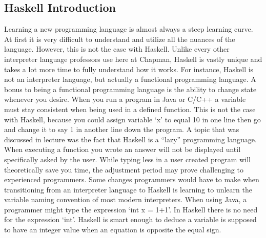 \documentclass{article}
\begin{document}
    \subsection {Haskell Introduction}
    Learning a new programming language is almost always a steep learning curve. At first it is very difficult to understand and utilize all the nuances of the language. However, this is not the case with Haskell. Unlike every other interpreter language professors use here at Chapman, Haskell is vastly unique and takes a lot more time to fully understand how it works. For instance, Haskell is not an interpreter language, but actually a functional programming language. A bonus to being a functional programming language is the ability to change state whenever you desire. When you run a program in Java or C/C++ a variable must stay consistent when being used in a defined function. This is not the case with Haskell, because you could assign variable ‘x’ to equal 10 in one line then go and change it to say 1 in another line down the program. A topic that was discussed in lecture was the fact that Haskell is a “lazy” programming language. When executing a function you wrote an answer will not be displayed until specifically asked by the user. While typing less in a user created program will theoretically save you time, the adjustment period may prove challenging to experienced programmers. 
    \medskip
    \noindent Some changes programmers would have to make when transitioning from an interpreter language to Haskell is learning to unlearn the variable naming convention of most modern interpreters. When using Java, a programmer might type the expression ‘int x = 1+1’. In Haskell there is no need for the expression ‘int’. Haskell is smart enough to deduce a variable is supposed to have an integer value when an equation is opposite the equal sign.  
    
\end{document}
